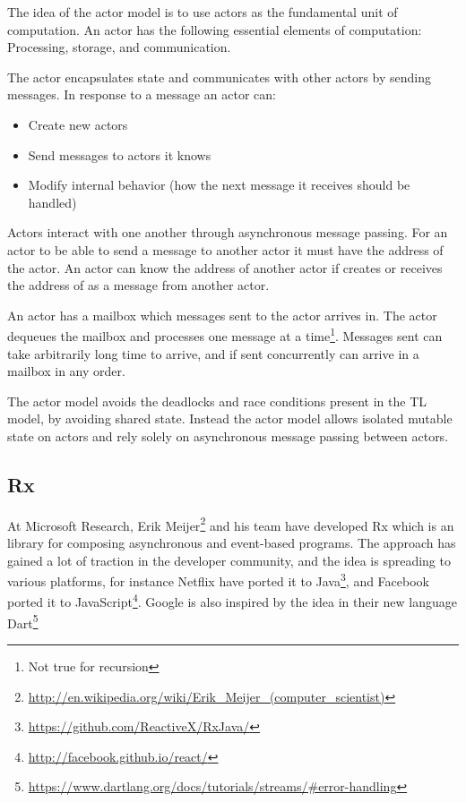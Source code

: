 The idea of the actor model is to use actors as the fundamental unit of computation. An actor has the following essential elements of computation\cite{actorLangNextVideo}: Processing, storage, and communication.

The actor encapsulates state and communicates with other actors by sending messages. In response to a message an actor can\cite{hewitt2014actor}:
\begin{itemize}
\item Create new actors
\item Send messages to actors it knows
\item Modify internal behavior (how the next message it receives should be handled)
\end{itemize}
Actors interact with one another through asynchronous message passing. For an actor to be able to send a message to another actor it must have the address of the actor. An actor  can know the address of another actor  if  creates  or receives the address of  as a message from another actor.

An actor has a mailbox which messages sent to the actor arrives in. The actor dequeues the mailbox and processes one message at a time\footnote{Not true for recursion}. Messages sent can take arbitrarily long time to arrive, and if sent concurrently can arrive in a mailbox in any order\cite{hewitt2014actor}.

The actor model avoids the deadlocks and race conditions present in the \ac{TL} model, by avoiding shared state\citep[Chap. 32]{odersky2011programming}. Instead the actor model allows isolated mutable state on actors and rely solely on asynchronous message passing between actors.



\subsection{\acl{Rx}}
At Microsoft Research, Erik Meijer\footnote{\url{http://en.wikipedia.org/wiki/Erik_Meijer_(computer_scientist)}} and his team have developed \ac{Rx} which is an library for composing asynchronous and event-based programs. The approach has gained a lot of traction in the developer community, and the idea is spreading to various platforms, for instance Netflix have ported it to Java\footnote{\url{https://github.com/ReactiveX/RxJava/}}, and Facebook ported it to JavaScript\footnote{\url{http://facebook.github.io/react/}}. Google is also inspired by the idea in their new language Dart\footnote{\url{https://www.dartlang.org/docs/tutorials/streams/\#error-handling}}


